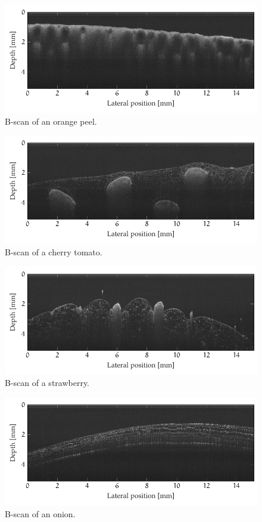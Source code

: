 \begin{figure}[hbt]
	\centering
	\includegraphics[width=0.9\linewidth]{gfx/ch4/axsun/no-bande/orange-peel}
	\caption{B-scan of an orange peel.}\label{fig:orange-peel}
\end{figure}

\begin{figure}[hbt]
	\centering
	\includegraphics[width=0.9\linewidth]{gfx/ch4/axsun/no-bande/tomato-1}
	\caption{B-scan of a cherry tomato.}\label{fig:tomato-1}
\end{figure}

\begin{figure}[htb]
	\centering
	\includegraphics[width=0.9\linewidth]{gfx/ch4/axsun/no-bande/strawberry-1}
	\caption{B-scan of a strawberry.}\label{fig:strawberry}
\end{figure}	

\begin{figure}[htb]
	\centering
	\includegraphics[width=0.9\linewidth]{gfx/ch4/axsun/no-bande/red-onion-2}
	\caption{B-scan of an onion.}\label{fig:red-onion-2}
\end{figure}

